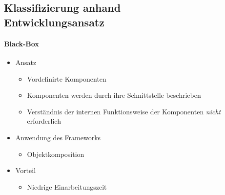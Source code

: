 \documentclass
[
	8pt,		%
	ngerman,	%
	a4paper,	%
	landscape,	%
	final		%
]{extarticle}
\begin{document}
\begin{multicols*}{4}
	\subsection{Klassifizierung anhand\\Entwicklungsansatz}
	{
		\setlength{\columnseprule}{0pt}
		\begin{multicols*}{2}
			\paragraph{Black-Box}
			\begin{itemize}
				\item Ansatz
				      \begin{itemize}[leftmargin=4pt,nolistsep]
					      \item Vordefinirte Komponenten
					      \item Komponenten werden durch ihre Schnittstelle
					            beschrieben
					      \item Verständnis der internen Funktionsweise der
					            Komponenten \emph{nicht} erforderlich
				      \end{itemize}
				\item Anwendung des Frameworks
				      \begin{itemize}[leftmargin=4pt,nolistsep]
					      \item Objektkomposition
				      \end{itemize}
				\item Vorteil
				      \begin{itemize}[leftmargin=4pt,nolistsep]
					      \item Niedrige Einarbeitungszeit
				      \end{itemize}
			\end{itemize}
			\columnbreak

\end{multicols*}}
\end{multicols*}
\end{document}
